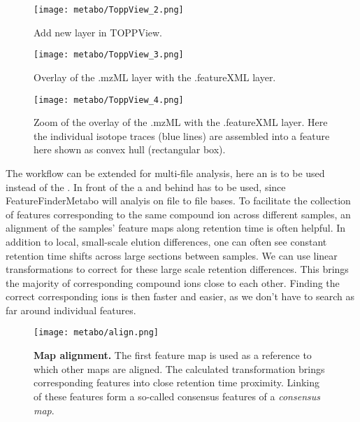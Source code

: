\begin{figure}[htbp]
  \centering
  \texttt{[image: metabo/ToppView\_2.png]}
  \caption{Add new layer in TOPPView.}
  \label{fig:ToppView_2}
\end{figure}

\begin{figure}[htbp]
  \centering
  \texttt{[image: metabo/ToppView\_3.png]}
  \caption{Overlay of the .mzML layer with the .featureXML layer. }
  \label{fig:ToppView_3}
\end{figure}

\begin{figure}[htbp]
  \centering
  \texttt{[image: metabo/ToppView\_4.png]}
  \caption{Zoom of the overlay of the .mzML with the .featureXML layer. Here the individual isotope traces (blue lines) are assembled into a feature here shown as convex hull (rectangular box).}
  \label{fig:ToppView_4}
\end{figure}

The workflow can be extended for multi-file analysis, here an  is to be used instead of the .  In front of the  a  and behind  has to be used, since FeatureFinderMetabo will analyis on file to file bases. 
\newline
To facilitate the collection of features corresponding to the same compound ion across different samples, an alignment of the samples' feature maps along retention time is often helpful. In addition to local, small-scale elution differences, one can often see constant retention time shifts across large sections between samples. We can use linear transformations to correct for these large scale retention differences. This  brings the majority of corresponding compound ions close to each other. Finding the correct corresponding ions is then faster and easier, as we don't have to search as far around individual features.

\begin{figure}[!htbp]
	\centering
	\texttt{[image: metabo/align.png]}
	\caption[Map alignment]
	{
	\textbf{Map alignment.} The first feature map is used as a reference to which other maps are aligned. The calculated transformation brings corresponding features into close retention time proximity. Linking of these features form a so-called consensus features of a \textit{consensus map}.
	}
	\label{bg_alignment}
\end{figure}

